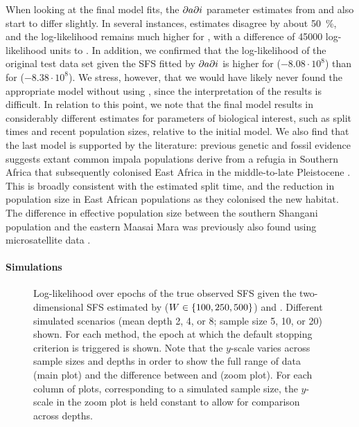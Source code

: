 When looking at the final model fits, the $\partial a \partial i$ parameter estimates from \realsfs and \winsfs also start to differ slightly.
In several instances, estimates disagree by about \SI{50}{\percent}, and the log-likelihood remains much higher for \winsfs, with a difference of  \num{45000} log-likelihood units to \realsfs.
In addition, we confirmed that the log-likelihood of the original test data set given the SFS fitted by $\partial a \partial i$ is higher for \winsfs ($-8.08 \cdot 10^8$) than for \realsfs ($-8.38 \cdot 10^8$).
We stress, however, that we would have likely never found the appropriate model without using \winsfs, since the interpretation of the \realsfs results is difficult.
In relation to this point, we note that the final model results in considerably different estimates for parameters of biological interest, such as split times and recent population sizes, relative to the initial model.
We also find that the last model is supported by the literature:
previous genetic and fossil evidence suggests extant common impala populations derive from a refugia in Southern Africa that subsequently colonised East Africa in the middle-to-late Pleistocene \cite{Lorenzen2006, Lorenzen2012, Faith2013}.
This is broadly consistent with the estimated split time, and the reduction in population size in East African populations as they colonised the new habitat. The difference in effective population size between the southern Shangani population and the eastern Maasai Mara was previously also found using microsatellite data \cite{Lorenzen2006}.

\paragraph{Simulations}

\begin{figure}
    \begin{center}
    \end{center}
    \caption{
        Log-likelihood over epochs of the true observed SFS given the two-dimensional SFS estimated by \winsfs ($W \in \{100, 250, 500\}$) and \realsfs.
        Different simulated scenarios (mean depth \num{2}, \num{4}, or \num{8}; sample size \num{5}, \num{10}, or \num{20}) shown.
        For each method, the epoch at which the default stopping criterion is triggered is shown.        
        Note that the $y$-scale varies across sample sizes and depths in order to show the full range of data (main plot) and the difference between \realsfs and \winsfs (zoom plot).
        For each column of plots, corresponding to a simulated sample size, the $y$-scale in the zoom plot is held constant to allow for comparison across depths.
    }
    \label{fig:sim_loglik}
\end{figure}

